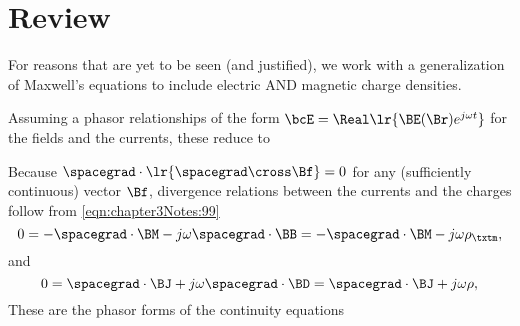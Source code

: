 %
%
%
%
%
%
%
%
%
%

\section{Review}

For reasons that are yet to be seen (and justified), we work with a generalization of Maxwell's equations to include
electric AND magnetic charge densities.



Assuming a phasor relationships of the form \( \bcE = \Real \lr{ \BE(\Br) e^{j \omega t}} \) for the fields and the currents, these reduce to




Because \( \spacegrad \cdot \lr{ \spacegrad \cross \Bf } = 0 \) for any (sufficiently continuous) vector \( \Bf \), divergence relations between the currents and the charges follow from \cref{eqn:chapter3Notes:99}
%
\begin{dmath}\label{eqn:chapter3Notes:180}
0
= -\spacegrad \cdot \BM - j \omega \spacegrad \cdot \BB
= -\spacegrad \cdot \BM - j \omega \rho_\txtm,
\end{dmath}
%
and
%
\begin{dmath}\label{eqn:chapter3Notes:200}
0
= \spacegrad \cdot \BJ + j \omega \spacegrad \cdot \BD
= \spacegrad \cdot \BJ + j \omega \rho,
\end{dmath}
%
These are the phasor forms of the continuity equations

